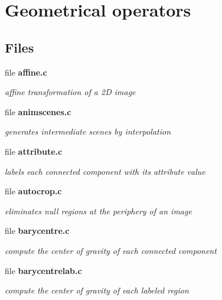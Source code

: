 \section{Geometrical operators}
\label{group__geo}
\subsection*{Files}
\begin{CompactItemize}
\item 
file \bf{affine.c}
\begin{CompactList}\small\item\em affine transformation of a 2D image \item\end{CompactList}

\item 
file \bf{animscenes.c}
\begin{CompactList}\small\item\em generates intermediate scenes by interpolation \item\end{CompactList}

\item 
file \bf{attribute.c}
\begin{CompactList}\small\item\em labels each connected component with its attribute value \item\end{CompactList}

\item 
file \bf{autocrop.c}
\begin{CompactList}\small\item\em eliminates null regions at the periphery of an image \item\end{CompactList}

\item 
file \bf{barycentre.c}
\begin{CompactList}\small\item\em compute the center of gravity of each connected component \item\end{CompactList}

\item 
file \bf{barycentrelab.c}
\begin{CompactList}\small\item\em compute the center of gravity of each labeled region \item\end{CompactList}


\end{CompactItemize}
